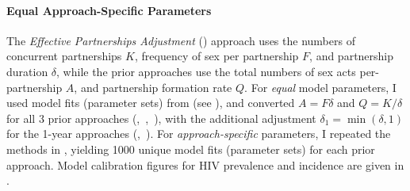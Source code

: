 \paragraph{Equal \vs Approach-Specific Parameters}
The \emph{Effective Partnerships Adjustment} (\epa) approach uses the
numbers of concurrent partnerships $K$,
frequency of sex per partnership $F$,
and partnership duration $\delta$,
while the prior approaches use the
total numbers of sex acts per-partnership $A$,
and partnership formation rate $Q$.
For \emph{equal} model parameters,
I used model fits (parameter sets) from \epa (see ),
and converted $A = F \delta$ and $Q = K/\delta$ for all 3 prior approaches (\ird,~\iry,~\ipy),
with the additional adjustment $\delta_1 = \min{(\delta,1)}$ for the 1-year approaches (\iry,~\ipy).
For \emph{approach-specific} parameters, I repeated the methods in ,
yielding 1000 unique model fits (parameter sets) for each prior approach.
Model calibration figures for HIV prevalence and incidence are given in .
